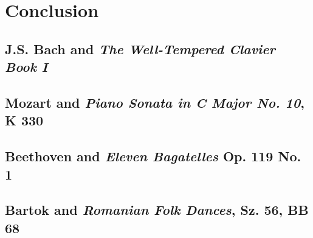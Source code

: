 \chapter*{Conclusion}\label{conclusion}

\section*{J.S. Bach and \textit{The Well-Tempered Clavier Book I}}

\section*{Mozart and \textit{Piano Sonata in C Major No. 10}, K 330}

\section*{Beethoven and \textit{Eleven Bagatelles} Op. 119 No. 1}

\section*{Bartok and \textit{Romanian Folk Dances}, Sz. 56, BB 68}




